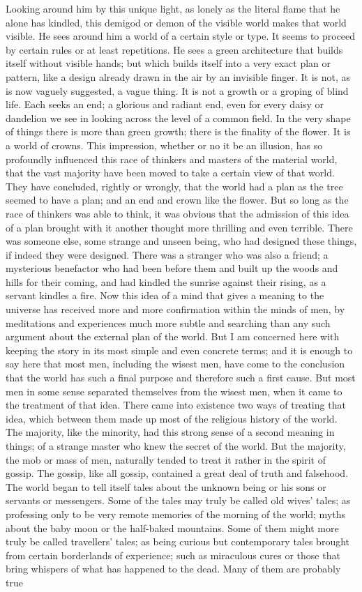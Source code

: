 Looking around him by this unique light, as lonely as the literal flame that he alone has kindled, this demigod or demon of the visible world makes that world visible. He sees around him a world of a certain style or type. It seems to proceed by certain rules or at least repetitions. He sees a green architecture that builds itself without visible hands; but which builds itself into a very exact plan or pattern, like a design already drawn in the air by an invisible finger. It is not, as is now vaguely suggested, a vague thing. It is not a growth or a groping of blind life. Each seeks an end; a glorious and radiant end, even for every daisy or dandelion we see in looking across the level of a common field. In the very shape of things there is more than green growth; there is the finality of the flower. It is a world of crowns. This impression, whether or no it be an illusion, has so profoundly influenced this race of thinkers and masters of the material world, that the vast majority have been moved to take a certain view of that world. They have concluded, rightly or wrongly, that the world had a plan as the tree seemed to have a plan; and an end and crown like the flower. But so long as the race of thinkers was able to think, it was obvious that the admission of this idea of a plan brought with it another thought more thrilling and even terrible. There was someone else, some strange and unseen being, who had designed these things, if indeed they were designed. There was a stranger who was also a friend; a mysterious benefactor who had been before them and built up the woods and hills for their coming, and had kindled the sunrise against their rising, as a servant kindles a fire. Now this idea of a mind that gives a meaning to the universe has received more and more confirmation within the minds of men, by meditations and experiences much more subtle and searching than any such argument about the external plan of the world. But I am concerned here with keeping the story in its most simple and even concrete terms; and it is enough to say here that most men, including the wisest men, have come to the conclusion that the world has such a final purpose and therefore such a first cause. But most men in some sense separated themselves from the wisest men, when it came to the treatment of that idea. There came into existence two ways of treating that idea, which between them made up most of the religious history of the world. The majority, like the minority, had this strong sense of a second meaning in things; of a strange master who knew the secret of the world. But the majority, the mob or mass of men, naturally tended to treat it rather in the spirit of gossip. The gossip, like all gossip, contained a great deal of truth and falsehood. The world began to tell itself tales about the unknown being or his sons or servants or messengers. Some of the tales may truly be called old wives' tales; as professing only to be very remote memories of the morning of the world; myths about the baby moon or the half-baked mountains. Some of them might more truly be called travellers' tales; as being curious but contemporary tales brought from certain borderlands of experience; such as miraculous cures or those that bring whispers of what has happened to the dead. Many of them are probably true 